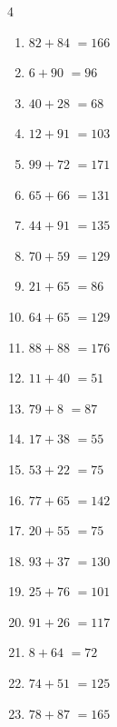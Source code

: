 \begin{multicols}{4}
\begin{enumerate}
  \item $82+84$
        $=166$

  \item $6+90$
        $=96$

  \item $40+28$
        $=68$

  \item $12+91$
        $=103$

  \item $99+72$
        $=171$

  \item $65+66$
        $=131$

  \item $44+91$
        $=135$

  \item $70+59$
        $=129$

  \item $21+65$
        $=86$

  \item $64+65$
        $=129$

  \item $88+88$
        $=176$

  \item $11+40$
        $=51$

  \item $79+8$
        $=87$

  \item $17+38$
        $=55$

  \item $53+22$
        $=75$

  \item $77+65$
        $=142$

  \item $20+55$
        $=75$

  \item $93+37$
        $=130$

\columnbreak %

  \item $25+76$
        $=101$

  \item $91+26$
        $=117$

  \item $8+64$
        $=72$

  \item $74+51$
        $=125$

  \item $78+87$
        $=165$


\end{enumerate}
\end{multicols}
